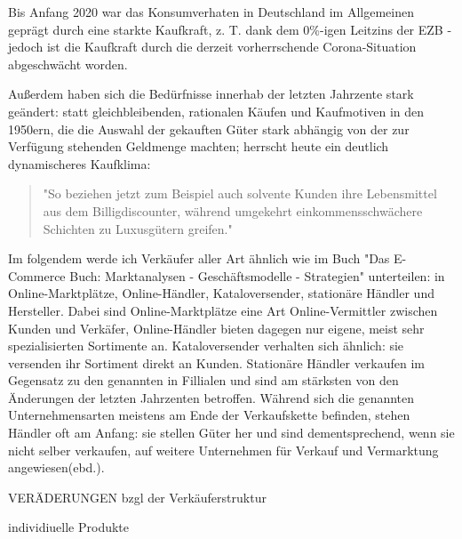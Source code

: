 \iffalse
Einteilung in: Online-Marktplätze + Online-Händler, Intermediäre, Kataloversender, stationäre Händler, Hersteller/Marken \cite{Graf}

entwicklung des kaufprozesses: graf:abbildung; 

https://edoc.sub.uni-hamburg.de/hcu/volltexte/2017/370/pdf/Ebert_Kirsten.pdf Anfang

änderung kaufablauf: \cite{Schaefers}
\fi

Bis Anfang 2020 war das Konsumverhaten in Deutschland im Allgemeinen geprägt durch eine starkte Kaufkraft, z. T. dank dem 0\%-igen Leitzins der \ac{EZB}\cite[S. 49]{Ebert} - jedoch ist die Kaufkraft durch die derzeit vorherrschende Corona-Situation abgeschwächt worden\cite{BfWE}. 

Außerdem haben sich die Bedürfnisse innerhab der letzten Jahrzente stark geändert: statt gleichbleibenden, rationalen Käufen und Kaufmotiven in den 1950ern, die die Auswahl der gekauften Güter stark abhängig von der zur Verfügung stehenden Geldmenge machten\cite[S. 38]{Schramm}; herrscht heute ein deutlich dynamischeres Kaufklima:
\begin{quote}
"So beziehen jetzt zum Beispiel auch solvente Kunden ihre Lebensmittel aus dem Billigdiscounter, während  umgekehrt  einkommensschwächere  Schichten  zu  Luxusgütern  greifen."\cite[S. 43]{Nitt}
\end{quote}

Im folgendem werde ich Verkäufer aller Art ähnlich wie im Buch "Das E-Commerce Buch: Marktanalysen - Geschäftsmodelle - Strategien" unterteilen: in Online-Marktplätze, Online-Händler, Kataloversender, stationäre Händler und Hersteller\cite[S. 18ff]{Graf}. Dabei sind Online-Marktplätze eine Art Online-Vermittler zwischen Kunden und Verkäfer, Online-Händler bieten dagegen nur eigene, meist sehr spezialisierten Sortimente an. Kataloversender verhalten sich ähnlich: sie versenden ihr Sortiment direkt an Kunden. Stationäre Händler verkaufen im Gegensatz zu den genannten in Fillialen und sind am stärksten von den Änderungen der letzten Jahrzenten betroffen. Während sich die genannten Unternehmensarten meistens am Ende der Verkaufskette befinden, stehen Händler oft am Anfang: sie stellen Güter her und sind dementsprechend, wenn sie nicht selber verkaufen, auf weitere Unternehmen für Verkauf und Vermarktung angewiesen(ebd.). %


\iffalse 
    VERÄDERUNGEN bzgl der Verkäuferstruktur
    
        individiuelle Produkte
        
